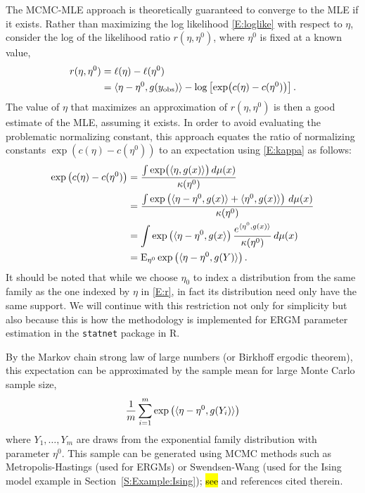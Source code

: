The MCMC-MLE approach is theoretically guaranteed to converge to the MLE if it exists.  
Rather than maximizing the log likelihood \eqref{E:loglike}
with respect to $\eta$, \citeauthor{Geyer:1992} consider 
the log of the likelihood ratio $r( \eta, \eta^0 )$, where $\eta^0$ 
is fixed at a known value,
\begin{align}
 r( \eta, \eta^0 ) &= \ell( \eta ) - \ell( \eta^0 ) \notag \\ 
				  &= \langle  \eta - \eta^0, g(y_{\text{obs}}) \rangle - \log \left [ \exp \bigl( c(\eta) - c(\eta^0) \bigr) \right ].\label{E:r}
\end{align}
The value of $\eta$ that maximizes an
approximation of $r( \eta, \eta^0 )$ is then a good estimate of the MLE, 
assuming it exists.  In order to avoid evaluating the problematic normalizing constant,
this approach equates the ratio of normalizing constants 
$\exp \left (  c(\eta) - c(\eta^0) \right )$ to an expectation 
using \eqref{E:kappa} as follows:
\begin{align*}
	\exp \left (  c(\eta) - c(\eta^0) \right ) &= \frac{ \int \exp \bigl ( \langle  \eta, g(x)  \rangle\bigr ) \, d\mu(x) }{ \kappa(\eta^0)  } \\
	&= \frac{ \int \exp \left ( \langle  \eta - \eta^0, g(x) \rangle + \langle  \eta^0, g(x) \rangle \right ) \, d\mu(x)  }{ \kappa(\eta^0) } \\
	&= \int \exp \left( \langle \eta - \eta^0, g(x \rangle \right ) \frac{ e^ { \langle  \eta^0, g(x) \rangle } }{ \kappa(\eta^0) } \, d\mu(x)\\
	&= \operatorname{E}_{\eta^0} \exp \left( \langle  \eta - \eta^0, g(Y) \rangle  \right ) .
\end{align*}
It should be noted that while we choose $\eta_0$ to index a distribution from the same
family as the one indexed by $\eta$ in \eqref{E:r}, in fact its distribution need 
only have the same support.
We will continue with this restriction not only for simplicity but also because this is how
the methodology is implemented for ERGM parameter estimation in the \texttt{statnet} package
\citep{ergm:R} in R.

By the Markov chain strong law of large numbers (or Birkhoff ergodic theorem), this 
expectation can be approximated by the sample mean for large Monte Carlo sample 
size,
\begin{align*}
	\frac{1}{m} \sum_{i=1}^{m}\exp \left ( \langle  \eta - \eta^0,g(Y_i) \rangle \right )
\end{align*}
where $Y_1, \ldots, Y_m$ are draws from the exponential family distribution with 
parameter $\eta^0$.  This sample can be generated using MCMC 
methods such as Metropolis-Hastings (used for ERGMs) or Swendsen-Wang (used for the Ising model example in Section~\ref{S:Example:Ising}); 
\hl{see} 
\citep{Brooks} and references cited therein.

